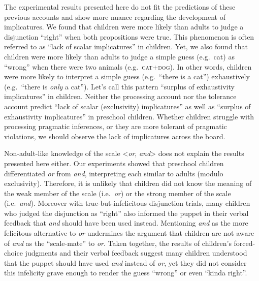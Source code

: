 \documentclass[
  english,
  ,man,floatsintext]{apa6}
\begin{document}
The experimental results presented here do not fit the predictions of these previous accounts and show more nuance regarding the development of implicatures. We found that children were more likely than adults to judge a disjunction \enquote{right} when both propositions were true. This phenomenon is often referred to as \enquote{lack of scalar implicatures} in children. Yet, we also found that children were more likely than adults to judge a simple guess (e.g.~cat) as \enquote{wrong} when there were two animals (e.g.~\textsc{cat+dog}). In other words, children were more likely to interpret a simple guess (e.g.~\enquote{there is a cat}) exhaustively (e.g.~\enquote{there is \emph{only} a cat}). Let's call this pattern \enquote{surplus of exhaustivity implicatures} in children. Neither the processing account nor the tolerance account predict \enquote{lack of scalar (exclusivity) implicatures} as well as \enquote{surplus of exhaustivity implicatures} in preschool children. Whether children struggle with processing pragmatic inferences, or they are more tolerant of pragmatic violations, we should observe the lack of implicatures across the board.

Non-adult-like knowledge of the scale \textless{}\emph{or}, \emph{and}\textgreater{} does not explain the results presented here either. Our experiments showed that preschool children differentiated \emph{or} from \emph{and}, interpreting each similar to adults (modulo exclusivity). Therefore, it is unlikely that children did not know the meaning of the weak member of the scale (i.e.~\emph{or}) or the strong member of the scale (i.e.~\emph{and}). Moreover with true-but-infelicitous disjunction trials, many children who judged the disjunction as \enquote{right} also informed the puppet in their verbal feedback that \emph{and} should have been used instead. Mentioning \emph{and} as the more felicitous alternative to \emph{or} undermines the argument that children are not aware of \emph{and} as the \enquote{scale-mate} to \emph{or}. Taken together, the results of children's forced-choice judgments and their verbal feedback suggest many children understood that the puppet should have used \emph{and} instead of \emph{or}, yet they did not consider this infelicity grave enough to render the guess \enquote{wrong} or even \enquote{kinda right}.
\end{document}

